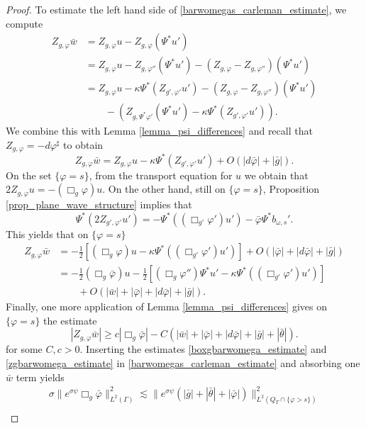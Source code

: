 \documentclass[11pt,letterpaper]{amsart}
\theoremstyle{definition}
\numberwithin{equation}{section}
\newcommand{\norm}[1]{\lVert #1 \rVert}         %
\begin{document}
\begin{proof}
To estimate the left hand side of \eqref{barwomegas_carleman_estimate}, we compute  
\begin{align*}
Z_{g,\varphi} \bar{w} &= Z_{g,\varphi} u - Z_{g,\varphi} (\Psi^* u') \\
  &= Z_{g,\varphi} u - Z_{g,\varphi''} (\Psi^* u') - (Z_{g,\varphi} - Z_{g,\varphi''}) (\Psi^* u') \\
  &= Z_{g,\varphi} u - \kappa \Psi^* ( Z_{g',\varphi'} u') - (Z_{g,\varphi} - Z_{g,\varphi''}) (\Psi^* u') \\
  & \qquad -  (Z_{g,\Psi^* \varphi'} (\Psi^* u') - \kappa \Psi^* ( Z_{g',\varphi'} u')).
\end{align*}
We combine this with Lemma \ref{lemma_psi_differences} and recall that $Z_{g,\varphi} = -d\varphi^\sharp$ to obtain 
\[
Z_{g,\varphi} \bar{w} = Z_{g,\varphi} u - \kappa \Psi^* ( Z_{g',\varphi'} u') + O(| d \bar{\varphi}| + |\bar{g}|).
\]
On the set $\{ \varphi = s \}$, from the transport equation for $u$ we obtain that $2 Z_{g,\varphi} u = -(\Box_g \varphi) u$. On the other hand, still on $\{ \varphi = s \}$, Proposition \ref{prop_plane_wave_structure} implies that 
\[
\Psi^* (2 Z_{g',\varphi'} u') = -\Psi^* ( (\Box_{g'} \varphi') u') - \bar{\varphi} \Psi^* b_{\omega,s}'.
\]
This yields that on $\{ \varphi = s \}$  
\begin{align*}
Z_{g,\varphi} \bar{w} &= -\frac{1}{2} \left[ (\Box_g \varphi) u - \kappa \Psi^* ( (\Box_{g'} \varphi') u' ) \right] + O(|\bar{\varphi}| + |d \bar{\varphi}| + |\bar{g}|) \\
 &= -\frac{1}{2} (\Box_g \bar{\varphi}) u -\frac{1}{2} \left[ (\Box_g \varphi'') \Psi^* u' - \kappa \Psi^* ( (\Box_{g'} \varphi') u' ) \right] \\
 &\qquad + O(|\bar{w}| + |\bar{\varphi}| + |d \bar{\varphi}| + |\bar{g}|).
\end{align*}
Finally, one more application of Lemma \ref{lemma_psi_differences} gives on $\{ \varphi = s \}$ the estimate 
\begin{equation}  \label{zgbarwomega_estimate}
|Z_{g,\varphi} \bar{w}| \geq c |\Box_g \bar{\varphi}| - C(|\bar{w}| + |\bar{\varphi}| + |d \bar{\varphi}| + |\bar{g}| + |\bar{\theta}|).
\end{equation}
for some $C, c > 0$. Inserting the estimates \eqref{boxgbarwomega_estimate} and \eqref{zgbarwomega_estimate} in \eqref{barwomegas_carleman_estimate} and absorbing one $\bar{w}$ term yields 
\begin{multline*}
\sigma \norm{e^{\sigma \psi} \Box_g \bar{\varphi}}_{L^2(\Gamma)}^2 \lesssim \norm{e^{\sigma \psi} (|\bar{g}| + |\bar{\theta}| + |\bar{\varphi}| )}_{L^2(Q_T \cap \{ \varphi > s \})}^2 \\

\end{multline*}
\end{proof}
\end{document}
